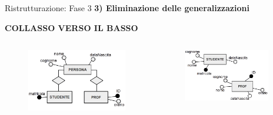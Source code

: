 \begin{frame}{Ristrutturazione: Fase 3}
\textbf{3) Eliminazione delle generalizzazioni}
\\\vspace{2em}
\begin{center}
    \textbf{COLLASSO VERSO IL BASSO}
\end{center}
\begin{columns}
        \begin{column}{0.5\textwidth}
            \begin{figure}[h]
        \centering
        \includegraphics[width=1\textwidth]{img/i6.png}
    \end{figure}
        \end{column}
        \begin{column}{0.5\textwidth}
            \begin{figure}[h]
        \centering
        \includegraphics[width=0.9\textwidth]{img/i9.png}
    \end{figure}
        \end{column}
    \end{columns}
\end{frame}
